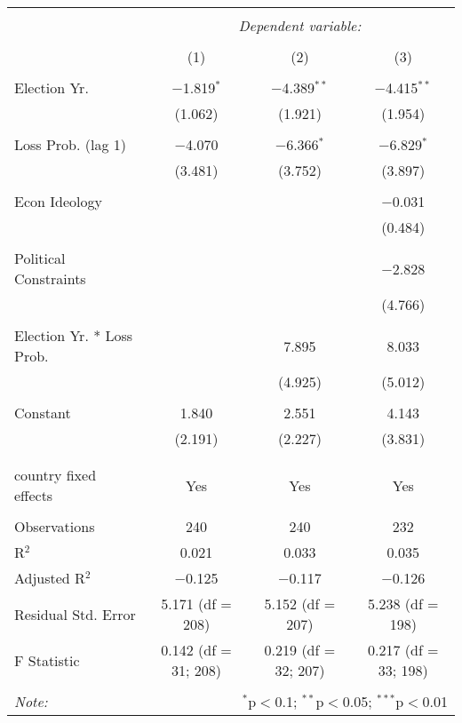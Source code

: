 
\begingroup 
\footnotesize 
\begin{tabular}{@{\extracolsep{5pt}}lccc} 
\\[-1.8ex]\hline 
\hline \\[-1.8ex] 
 & \multicolumn{3}{c}{\textit{Dependent variable:}} \\ 
\cline{2-4} 
\\[-1.8ex] & (1) & (2) & (3)\\ 
\hline \\[-1.8ex] 
 Election Yr. & $-$1.819$^{*}$ & $-$4.389$^{**}$ & $-$4.415$^{**}$ \\ 
  & (1.062) & (1.921) & (1.954) \\ 
  & & & \\ 
 Loss Prob. (lag 1) & $-$4.070 & $-$6.366$^{*}$ & $-$6.829$^{*}$ \\ 
  & (3.481) & (3.752) & (3.897) \\ 
  & & & \\ 
 Econ Ideology &  &  & $-$0.031 \\ 
  &  &  & (0.484) \\ 
  & & & \\ 
 Political Constraints &  &  & $-$2.828 \\ 
  &  &  & (4.766) \\ 
  & & & \\ 
 Election Yr. * Loss Prob. &  & 7.895 & 8.033 \\ 
  &  & (4.925) & (5.012) \\ 
  & & & \\ 
 Constant & 1.840 & 2.551 & 4.143 \\ 
  & (2.191) & (2.227) & (3.831) \\ 
  & & & \\ 
\hline \\[-1.8ex] 
country fixed effects & Yes & Yes & Yes \\ 
\hline \\[-1.8ex] 
Observations & 240 & 240 & 232 \\ 
R$^{2}$ & 0.021 & 0.033 & 0.035 \\ 
Adjusted R$^{2}$ & $-$0.125 & $-$0.117 & $-$0.126 \\ 
Residual Std. Error & 5.171 (df = 208) & 5.152 (df = 207) & 5.238 (df = 198) \\ 
F Statistic & 0.142 (df = 31; 208) & 0.219 (df = 32; 207) & 0.217 (df = 33; 198) \\ 
\hline 
\hline \\[-1.8ex] 
\textit{Note:}  & \multicolumn{3}{r}{$^{*}$p$<$0.1; $^{**}$p$<$0.05; $^{***}$p$<$0.01} \\ 
\end{tabular} 
\endgroup 
